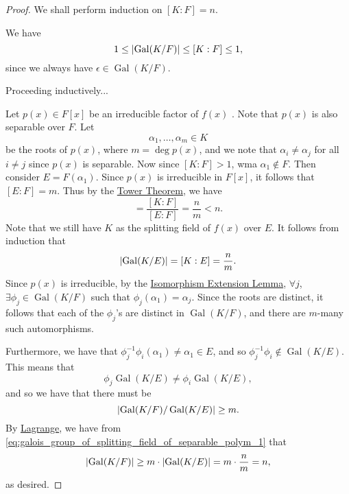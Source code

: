 \documentclass[notoc,notitlepage,nobib]{tufte-book}
\DeclareMathOperator{\Gal}{Gal}
\begin{document}
\begin{proof}
  We shall perform induction on $[ K : F ] = n$.

  \noindent
   We have
  \begin{equation*}
    1 \leq \abs{ \Gal(K / F) } \leq [ K : F ] \leq 1,
  \end{equation*}
  since we always have $\epsilon \in \Gal(K / F)$.
  
  Proceeding inductively...
  
  \noindent
   Let $p(x) \in F[x]$ be an irreducible factor of $f(x)$
  . Note that
  $p(x)$ is also separable over $F$. Let
  \begin{equation*}
    \alpha_1, \ldots, \alpha_m \in K
  \end{equation*}
  be the roots of $p(x)$, where $m = \deg p(x)$, and we note that $\alpha_i \neq
  \alpha_j$ for all $i \neq j$ since $p(x)$ is separable. Now since $[ K : F ] >
  1$, wma $\alpha_1 \notin F$. Then consider $E = F(\alpha_1)$. Since $p(x)$ is
  irreducible in $F[x]$, it follows that $[ E : F ] = m$. Thus by the
  \hyperref[thm:tower_theorem]{Tower Theorem}, we have
  \begin{equation*}
    [ K : E ] = \frac{[ K : F ]}{[ E : F ]} = \frac{n}{m} < n.
  \end{equation*}
  Note that we still have $K$ as the splitting field of $f(x)$ over $E$. It
  follows from induction that
  \begin{equation}\label{eq:galois_group_of_splitting_field_of_separable_polym_1}
    \abs{ \Gal( K / E ) } = [ K : E ] = \frac{n}{m}.
  \end{equation}
  Since $p(x)$ is irreducible, by the
  \hyperref[lemma:isomorphism_extension_lemma]{Isomorphism Extension Lemma},
  $\forall j$, $\exists \phi_j \in \Gal(K / F)$ such that $\phi_j(\alpha_1) =
  \alpha_j$. Since the roots are distinct, it follows that each of the
  $\phi_j$'s are distinct in $\Gal (K / F)$, and there are $m$-many such
  automorphisms.

  Furthermore, we have that $\phi_j^{-1} \phi_i (\alpha_1) \neq \alpha_1 \in E$,
  and so $\phi_j^{-1} \phi_i \notin \Gal(K / E)$. This means that
  \begin{equation*}
    \phi_j \Gal(K / E) \neq \phi_i \Gal(K / E),
  \end{equation*}
  and so we have that there must be
  \begin{equation*}
    \abs{ \Gal(K / F) / \Gal(K / E) } \geq m.
  \end{equation*}
  By \hyperref[thm:lagrange_s_theorem]{Lagrange}, we have from
  \cref{eq:galois_group_of_splitting_field_of_separable_polym_1} that
  \begin{equation*}
    \abs{ \Gal(K / F) } \geq m \cdot \abs{ \Gal(K / E) } = m \cdot \frac{n}{m} =
    n,
  \end{equation*}
  as desired.
\end{proof}
\end{document}
